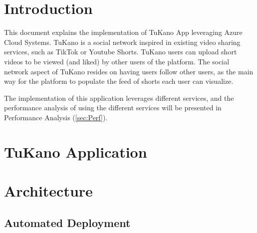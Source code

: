 \documentclass[10pt,a4paper,twocolumn]{article}
\title{\titulo}
\date{\data}
\author{\name\\ \institution}
\begin{document}

\maketitle

\section{Introduction}
\label{sec:intro}
This document explains the implementation of TuKano App leveraging Azure Cloud Systems{\cite {azure}}. TuKano is a social network inspired in existing video sharing services, such as TikTok or Youtube Shorts. TuKano users can upload short videos to be viewed (and liked) by other users of the platform. The social network aspect of TuKano resides on having users follow other users, as the main way for the platform to populate the feed of shorts each user can visualize.
\par The implementation of this application leverages different services, and the performance analysis of using the different services will be presented in Performance Analysis (\ref{sec:Perf}).

\section{TuKano Application}
\label{sec:application}

\section{Architecture}
\label{sec:architecture}

\subsection{Automated Deployment}
\label{sec:automatedDepl}
\end{document}
